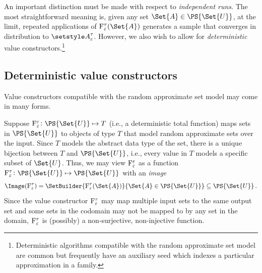 \documentclass[10pt,final,hidelinks]{article}
\numberwithin{equation}{section}
\begin{document}
An important distinction must be made with respect to \emph{independent runs}.
The most straightforward meaning is, given any set $\Set{A} \in \PS{\Set{U}}$, at the limit, repeated applications of $\ctor{\fprate}{\tprate}(\Set{A})$ generates a sample that converges in distribution to $\ASet{A}[\fprate][\tprate]$.
However, we also wish to allow for \emph{deterministic} value constructors.\footnote{Deterministic algorithms compatible with the random approximate set model are common but frequently have an auxiliary seed which indexes a particular approximation in a family.}

\subsection{Deterministic value constructors}
Value constructors compatible with the random approximate set model may come in many forms.


Suppose $\ctor{\fprate}{\fprate} \colon \PS{\Set{U}} \mapsto T$ (i.e., a deterministic total function) maps sets in $\PS{\Set{U}}$ to objects of type $T$ that model random approximate sets over the input.
Since $T$ models the abstract data type of the set, there is a unique bijection between $T$ and $\PS{\Set{{U}}}$, i.e., every value in $T$ models a specific subset of $\Set{U}$.
Thus, we may view $\ctor{\fprate}{\fprate}$ as a function $\ctor{\fprate}{\tprate} \colon \PS{\Set{U}} \mapsto \PS{\Set{U}}$ with an \emph{image}
\begin{equation}
\Image(\ctor{\fprate}{\tprate}) = \SetBuilder{\ctor{\fprate}{\tprate}(\Set{A})}{\Set{A} \in \PS{\Set{U}}} \subseteq \PS{\Set{U}}\,.
\end{equation}
Since the value constructor $\ctor{\fprate}{\tprate}$ may map multiple input sets to the same output set and some sets in the codomain may not be mapped to by any set in the domain, $\ctor{\fprate}{\tprate}$ is (possibly) a non-surjective, non-injective function.

\end{document}
